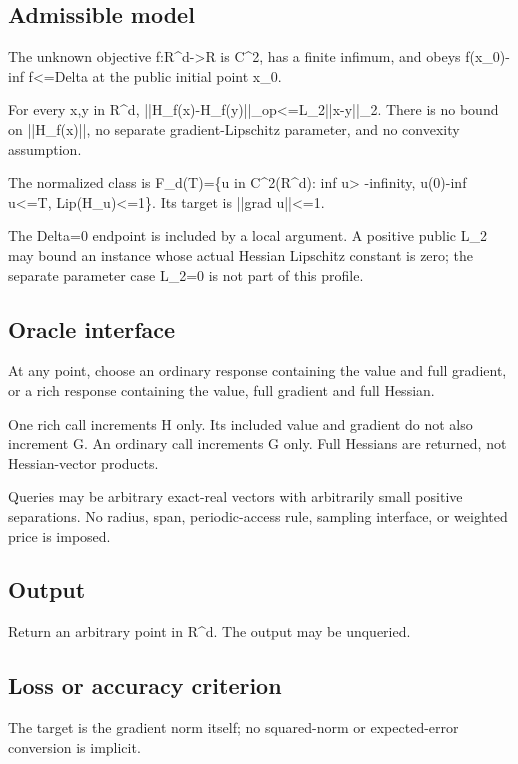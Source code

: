\documentclass[10pt,a4paper]{article}
\begin{document}
\subsection{Admissible model}
The unknown objective f:R\textasciicircum{}d->R is C\textasciicircum{}2, has a finite infimum, and obeys f(x\_0)-inf f<=Delta at the public initial point x\_0.

For every x,y in R\textasciicircum{}d, ||H\_f(x)-H\_f(y)||\_op<=L\_2||x-y||\_2. There is no bound on ||H\_f(x)||, no separate gradient-Lipschitz parameter, and no convexity assumption.

The normalized class is F\_d(T)=\{u in C\textasciicircum{}2(R\textasciicircum{}d): inf u> -infinity, u(0)-inf u<=T, Lip(H\_u)<=1\}. Its target is ||grad u||<=1.

The Delta=0 endpoint is included by a local argument. A positive public L\_2 may bound an instance whose actual Hessian Lipschitz constant is zero; the separate parameter case L\_2=0 is not part of this profile.

\subsection{Oracle interface}
At any point, choose an ordinary response containing the value and full gradient, or a rich response containing the value, full gradient and full Hessian.

One rich call increments H only. Its included value and gradient do not also increment G. An ordinary call increments G only. Full Hessians are returned, not Hessian-vector products.

Queries may be arbitrary exact-real vectors with arbitrarily small positive separations. No radius, span, periodic-access rule, sampling interface, or weighted price is imposed.

\subsection{Output}
Return an arbitrary point in R\textasciicircum{}d. The output may be unqueried.

\subsection{Loss or accuracy criterion}
The target is the gradient norm itself; no squared-norm or expected-error conversion is implicit.
\end{document}
